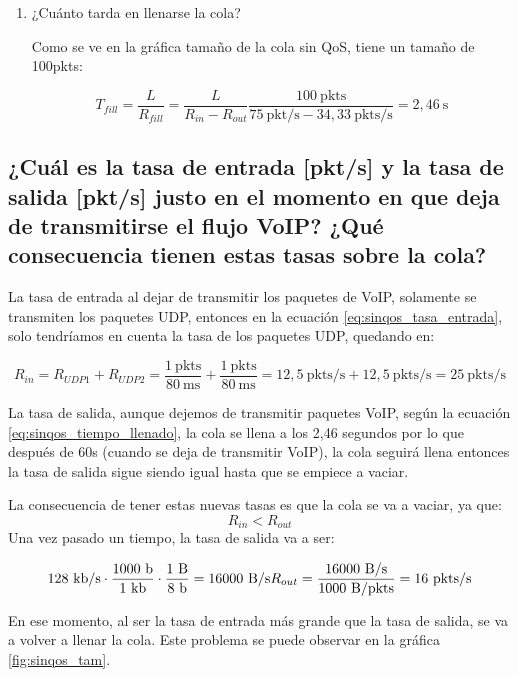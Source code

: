 \begin{enumerate}
    \item ¿Cuánto tarda en llenarse la cola?
    
    Como se ve en la gráfica tamaño de la cola sin QoS, tiene un tamaño de 100pkts:

    \[
    \label{eq:sinqos_tiempo_llenado}
      T_{fill} = \frac{L}{R_{fill}} = \frac{L}{R_{in} - R_{out}} \frac{100~\text{pkts}}{75~\text{pkt/s} - 34,33~\text{pkts/s}} = 2,46~\text{s}
    \]


\end{enumerate}

\subsection{¿Cuál es la tasa de entrada [pkt/s] y la tasa de salida [pkt/s] justo en el momento en que deja de
transmitirse el flujo VoIP? ¿Qué consecuencia tienen estas tasas sobre la cola?}
La tasa de entrada al dejar de transmitir los paquetes de VoIP, solamente se transmiten los paquetes UDP, entonces en la ecuación \ref{eq:sinqos_tasa_entrada},
solo tendríamos en cuenta la tasa de los paquetes UDP, quedando en:
    
\[
  R_{in} = R_{UDP1} + R_{UDP2} = \frac{1~\mathrm{pkts}}{80~\mathrm{ms}} + \frac{1~\mathrm{pkts}}{80~\mathrm{ms}} = 12,5~\mathrm{pkts/s} + 12,5~\mathrm{pkts/s} = 25~\mathrm{pkts/s}
\]

La tasa de salida, aunque dejemos de transmitir paquetes VoIP, según la ecuación \ref{eq:sinqos_tiempo_llenado}, la cola se llena a los 2,46 segundos
por lo que después de 60s (cuando se deja de transmitir VoIP), la cola seguirá llena entonces la tasa de salida sigue siendo igual hasta que 
se empiece a vaciar.

La consecuencia de tener estas nuevas tasas es que la cola se va a vaciar, ya que: \[R_{in} < R_{out}\]
Una vez pasado un tiempo, la tasa de salida va a ser:

\[
  128~\text{kb/s} \cdot \frac{1000~\text{b}}{1~\text{kb}} \cdot \frac{1~\text{B}}{8~\text{b}} = 16000~\text{B/s} \\
  R_{out} = \frac{16000~\text{B/s}}{1000~\text{B/pkts}} = 16~\text{pkts/s}
\]

En ese momento, al ser la tasa de entrada más grande que la tasa de salida, se va a volver a llenar la cola. Este problema se puede observar
en la gráfica \ref{fig:sinqos_tam}.

